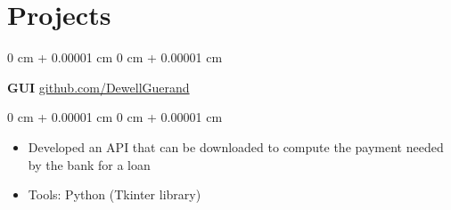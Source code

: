 \documentclass[10pt, letterpaper]{article}
\newenvironment{highlights}{
    \begin{itemize}[
        topsep=0.10 cm,
        parsep=0.10 cm,
        partopsep=0pt,
        itemsep=0pt,
        leftmargin=0 cm + 10pt
    ]
}{
    \end{itemize}
} %
\newenvironment{onecolentry}{
    \begin{adjustwidth}{
        0 cm + 0.00001 cm
    }{
        0 cm + 0.00001 cm
    }
}{
    \end{adjustwidth}
} %
\newenvironment{twocolentry}[2][]{
    \onecolentry
    \def\secondColumn{#2}
    \setcolumnwidth{\fill, 4.5 cm}
    \begin{paracol}{2}
}{
    \switchcolumn \raggedleft \secondColumn
    \end{paracol}
    \endonecolentry
} %
\begin{document}







    
    
    
    \section{Projects}



        
        \begin{twocolentry}{
            \href{https://github.com/DewellGuerand}{github.com/DewellGuerand}
        }
            \textbf{GUI}\end{twocolentry}

        \vspace{0.10 cm}
        \begin{onecolentry}
            \begin{highlights}
                \item Developed an API that can be downloaded to compute the payment needed by the bank for a loan
                \item Tools: Python (Tkinter library)
            \end{highlights}
        \end{onecolentry}
\end{document}
